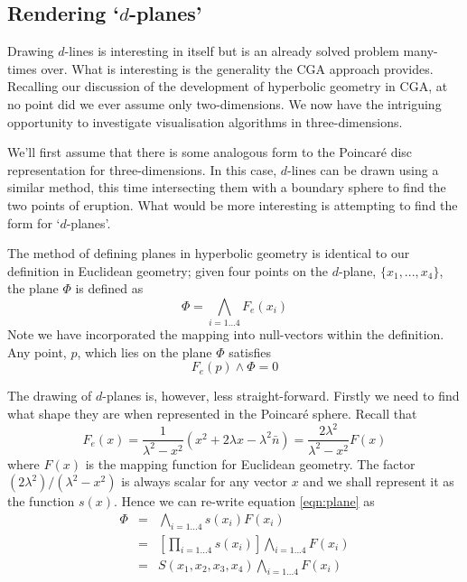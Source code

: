 \subsection{Rendering `$d$-planes'}


Drawing $d$-lines is interesting in itself but is an already solved 
problem many-times over. What is interesting is the generality the CGA
approach provides. Recalling our discussion of the development of
hyperbolic geometry in CGA, at no point did we ever assume only 
two-dimensions. We now have the intriguing opportunity to investigate
visualisation algorithms in three-dimensions.

We'll first assume that there is some analogous form to the Poincar\'e
disc representation for three-dimensions. In this case, $d$-lines can
be drawn using a similar method, this time intersecting them with a 
boundary sphere to find the two points of eruption. What would be 
more interesting is attempting to find the form for `$d$-planes'.

The method of defining planes in hyperbolic geometry is identical
to our definition in Euclidean geometry; given four points on the
$d$-plane, $\{ x_1, ..., x_4 \}$, the plane $\Phi$ is defined as
\begin{equation}
\Phi = \bigwedge_{i = 1...4} F_e(x_i)
\label{eqn:plane}
\end{equation}
Note we have incorporated the mapping into null-vectors within
the definition. Any point, $p$, which lies on the plane $\Phi$ satisfies
\[
F_e(p) \wedge \Phi = 0
\]

The drawing of $d$-planes is, however, less straight-forward. Firstly we
need to find what shape they are when represented in the Poincar\'e sphere.
Recall that
\[
F_e(x) = \frac{1}{\lambda^2 - x^2} (x^2 + 2\lambda x - \lambda^2\bar{n})
 =  \frac{2\lambda^2}{\lambda^2 - x^2} F(x)
\]
where $F(x)$ is the mapping function for Euclidean geometry. The factor
$(2\lambda^2) / (\lambda^2 - x^2)$ is always scalar for any vector
$x$ and we shall represent it as the function $s(x)$. Hence we can
re-write equation \ref{eqn:plane} as
\begin{eqnarray}
\Phi & = & \bigwedge_{i = 1...4} s(x_i)F(x_i) \\
     & = & \left[\prod_{i = 1...4} s(x_i)\right] \bigwedge_{i = 1...4} F(x_i) \\
     & = & S(x_1, x_2, x_3, x_4) \bigwedge_{i = 1...4} F(x_i) 
\end{eqnarray}

